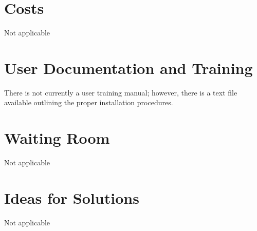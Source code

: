 \documentclass{article}
\begin{document}
\section{Costs}
Not applicable

\section{User Documentation and Training}
There is not currently a user training manual; however, there is a text file available outlining the proper installation procedures.

\section{Waiting Room}
Not applicable

\section{Ideas for Solutions}
Not applicable


\listoffigures
{}
\listoftables
\end{document}

